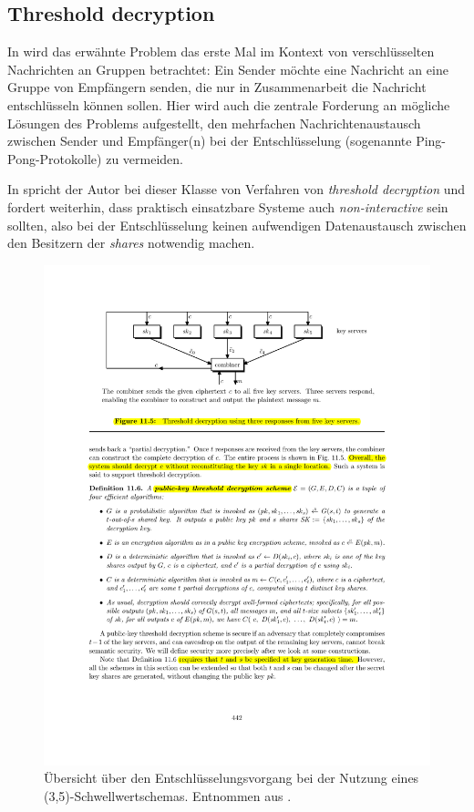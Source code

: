 \subsection*{Threshold decryption}


In \cite{desmedt1987} wird das erwähnte Problem das erste Mal im Kontext von verschlüsselten Nachrichten an Gruppen betrachtet: Ein Sender möchte eine Nachricht an eine Gruppe von Empfängern senden, die nur in Zusammenarbeit die Nachricht entschlüsseln können sollen. Hier wird auch die zentrale Forderung an mögliche Lösungen des Problems aufgestellt, den mehrfachen Nachrichtenaustausch zwischen Sender und Empfänger(n) bei der Entschlüsselung (sogenannte Ping-Pong-Protokolle) zu vermeiden. 

In \cite{desmedt1993} spricht der Autor bei dieser Klasse von Verfahren von \textit{threshold decryption} und fordert weiterhin, dass praktisch einsatzbare Systeme auch \textit{non-interactive} sein sollten, also bei der Entschlüsselung keinen aufwendigen Datenaustausch zwischen den Besitzern der \textit{shares} notwendig machen.

\begin{figure}[]
    \centering
        \includegraphics[clip, trim=3cm 21.2cm 3cm 2cm, width=1.00\textwidth]{img/threshold_decryption_excerpt.pdf}
    \caption{Übersicht über den Entschlüsselungsvorgang bei der Nutzung eines (3,5)-Schwellwertschemas. Entnommen aus \cite{boneh2016}.}
    \label{fig:threshold_decryption_combiner}
\end{figure}

